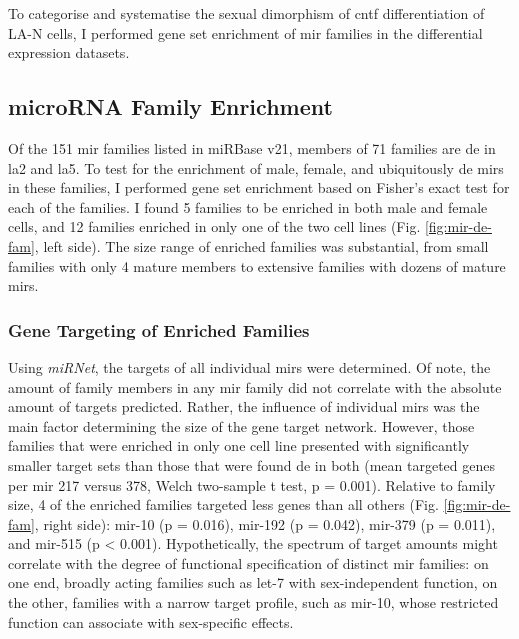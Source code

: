 To categorise and systematise the sexual dimorphism of \ac{cntf} differentiation of LA-N cells, I performed gene set enrichment of \ac{mir} families in the differential expression datasets.

\subsection{microRNA Family Enrichment}
Of the 151 \ac{mir} families listed in miRBase v21, members of 71 families are \ac{de} in \ac{la2} and \ac{la5}. To test for the enrichment of male, female, and ubiquitously \ac{de} \acp{mir} in these families, I performed gene set enrichment based on Fisher's exact test for each of the families. I found 5 families to be enriched in both male and female cells, and 12 families enriched in only one of the two cell lines (Fig. \ref{fig:mir-de-fam}, left side). The size range of enriched families was substantial, from small families with only 4 mature members to extensive families with dozens of mature \acp{mir}. 

\subsubsection{Gene Targeting of Enriched Families}
Using \textit{miRNet}, the targets of all individual \acp{mir} were determined. Of note, the amount of family members in any \ac{mir} family did not correlate with the absolute amount of targets predicted. Rather, the influence of individual \acp{mir} was the main factor determining the size of the gene target network. However, those families that were enriched in only one cell line presented with significantly smaller target sets than those that were found \ac{de} in both (mean targeted genes per \ac{mir} 217 versus 378, Welch two-sample t test, p = 0.001). Relative to family size, 4 of the enriched families targeted less genes than all others (Fig. \ref{fig:mir-de-fam}, right side): mir-10 (p = 0.016), mir-192 (p = 0.042), mir-379 (p = 0.011), and mir-515 (p < 0.001). Hypothetically, the spectrum of target amounts might correlate with the degree of functional specification of distinct \ac{mir} families: on one end, broadly acting families such as let-7 with sex-independent function, on the other, families with a narrow target profile, such as mir-10, whose restricted function can associate with sex-specific effects.

